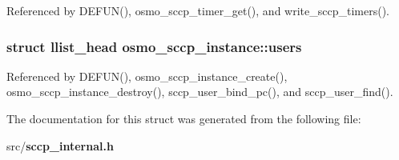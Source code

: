 Referenced by D\+E\+F\+U\+N(), osmo\+\_\+sccp\+\_\+timer\+\_\+get(), and write\+\_\+sccp\+\_\+timers().

\subsubsection[{users}]{\setlength{\rightskip}{0pt plus 5cm}struct llist\+\_\+head osmo\+\_\+sccp\+\_\+instance\+::users}\label{structosmo__sccp__instance_ad699d0e360f777f69c41f83660d8d46d}


Referenced by D\+E\+F\+U\+N(), osmo\+\_\+sccp\+\_\+instance\+\_\+create(), osmo\+\_\+sccp\+\_\+instance\+\_\+destroy(), sccp\+\_\+user\+\_\+bind\+\_\+pc(), and sccp\+\_\+user\+\_\+find().



The documentation for this struct was generated from the following file\+:\begin{DoxyCompactItemize}
\item 
src/{\bf sccp\+\_\+internal.\+h}\end{DoxyCompactItemize}
